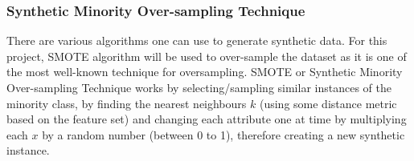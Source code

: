 \subsubsection{Synthetic Minority Over-sampling Technique}\label{sssec:smote}

\noindent There are various algorithms one can use to generate synthetic data. For this project, SMOTE algorithm will be used to over-sample the dataset as it is one of the most well-known technique for oversampling. SMOTE or Synthetic Minority Over-sampling Technique \cite{chawla2002smote} works by selecting/sampling similar instances of the minority class, by finding the nearest neighbours \(k\) (using some distance metric based on the feature set) and changing each attribute one at time by multiplying each \(x\) by a random number (between 0 to 1), therefore creating a new synthetic instance.       